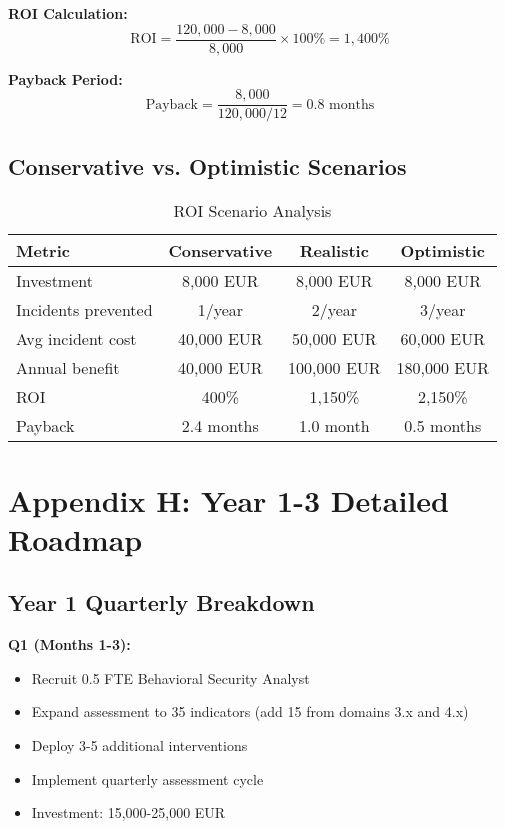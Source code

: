 \documentclass[11pt,a4paper]{article}
\begin{document}
\textbf{ROI Calculation:}
\begin{equation}
\text{ROI} = \frac{120,000 - 8,000}{8,000} \times 100\% = 1,400\%
\end{equation}

\textbf{Payback Period:}
\begin{equation}
\text{Payback} = \frac{8,000}{120,000/12} = 0.8 \text{ months}
\end{equation}

\subsection{Conservative vs. Optimistic Scenarios}

\begin{table}[h]
\centering
\caption{ROI Scenario Analysis}
\begin{tabular}{lccc}
\toprule
\textbf{Metric} & \textbf{Conservative} & \textbf{Realistic} & \textbf{Optimistic} \\
\midrule
Investment & 8,000 EUR & 8,000 EUR & 8,000 EUR \\
Incidents prevented & 1/year & 2/year & 3/year \\
Avg incident cost & 40,000 EUR & 50,000 EUR & 60,000 EUR \\
Annual benefit & 40,000 EUR & 100,000 EUR & 180,000 EUR \\
ROI & 400\% & 1,150\% & 2,150\% \\
Payback & 2.4 months & 1.0 month & 0.5 months \\
\bottomrule
\end{tabular}
\end{table}

\section{Appendix H: Year 1-3 Detailed Roadmap}

\subsection{Year 1 Quarterly Breakdown}

\textbf{Q1 (Months 1-3):}
\begin{itemize}
\item Recruit 0.5 FTE Behavioral Security Analyst
\item Expand assessment to 35 indicators (add 15 from domains 3.x and 4.x)
\item Deploy 3-5 additional interventions
\item Implement quarterly assessment cycle
\item Investment: 15,000-25,000 EUR
\end{itemize}
\end{document}
